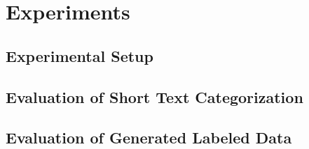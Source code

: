 \section{Experiments} \label{anno_salient:evaluation}

\subsection{Experimental Setup}

\subsection{Evaluation of Short Text Categorization}

\subsection{Evaluation of Generated Labeled Data}
